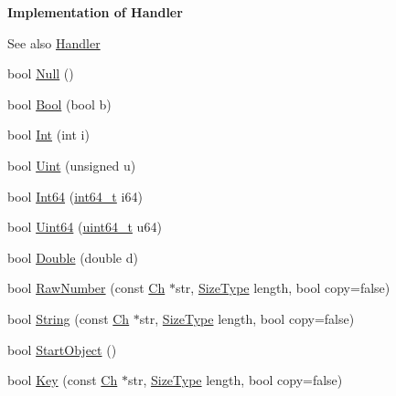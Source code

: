 \begin{Indent}\textbf{ Implementation of Handler}\par
{\em \begin{DoxySeeAlso}{See also}
\mbox{\hyperlink{classrapidjson_1_1_handler}{Handler}} 
\end{DoxySeeAlso}
}\begin{DoxyCompactItemize}
\item 
bool \mbox{\hyperlink{classrapidjson_1_1_pretty_writer_afb049092845d2c0168f1570cf4ad66bc}{Null}} ()
\item 
bool \mbox{\hyperlink{classrapidjson_1_1_pretty_writer_ab4507239564501014bed4375bdebc630}{Bool}} (bool b)
\item 
bool \mbox{\hyperlink{classrapidjson_1_1_pretty_writer_a631a35ee8006c1c218ce78e3d919c927}{Int}} (int i)
\item 
bool \mbox{\hyperlink{classrapidjson_1_1_pretty_writer_a93a81e65915f0b607a2f69b2d9728c39}{Uint}} (unsigned u)
\item 
bool \mbox{\hyperlink{classrapidjson_1_1_pretty_writer_aebdf6ed7eeb5e953b941239384d3a4e1}{Int64}} (\mbox{\hyperlink{stdint_8h_a414156feea104f8f75b4ed9e3121b2f6}{int64\+\_\+t}} i64)
\item 
bool \mbox{\hyperlink{classrapidjson_1_1_pretty_writer_a3a2d3bf5af1edf76b4d2c6b1fdf08d26}{Uint64}} (\mbox{\hyperlink{stdint_8h_aec6fcb673ff035718c238c8c9d544c47}{uint64\+\_\+t}} u64)
\item 
bool \mbox{\hyperlink{classrapidjson_1_1_pretty_writer_a912576054f9ebf5c614e42981f8404ce}{Double}} (double d)
\item 
bool \mbox{\hyperlink{classrapidjson_1_1_pretty_writer_a1189fbfd7e57207be1d5dc36d3d4b385}{Raw\+Number}} (const \mbox{\hyperlink{classrapidjson_1_1_pretty_writer_a74a38902073aa599c8bcc6a3ca6126d0}{Ch}} $\ast$str, \mbox{\hyperlink{namespacerapidjson_a44eb33eaa523e36d466b1ced64b85c84}{Size\+Type}} length, bool copy=false)
\item 
bool \mbox{\hyperlink{classrapidjson_1_1_pretty_writer_af3c6ad244ef86efafa62ff3b3dd8e25b}{String}} (const \mbox{\hyperlink{classrapidjson_1_1_pretty_writer_a74a38902073aa599c8bcc6a3ca6126d0}{Ch}} $\ast$str, \mbox{\hyperlink{namespacerapidjson_a44eb33eaa523e36d466b1ced64b85c84}{Size\+Type}} length, bool copy=false)
\item 
bool \mbox{\hyperlink{classrapidjson_1_1_pretty_writer_ac043c4de0728cdfa8739af94560bddc3}{Start\+Object}} ()
\item 
bool \mbox{\hyperlink{classrapidjson_1_1_pretty_writer_aec6183f368bb54310a41e0e1e00bf329}{Key}} (const \mbox{\hyperlink{classrapidjson_1_1_pretty_writer_a74a38902073aa599c8bcc6a3ca6126d0}{Ch}} $\ast$str, \mbox{\hyperlink{namespacerapidjson_a44eb33eaa523e36d466b1ced64b85c84}{Size\+Type}} length, bool copy=false)

\end{DoxyCompactItemize}
\end{Indent}
